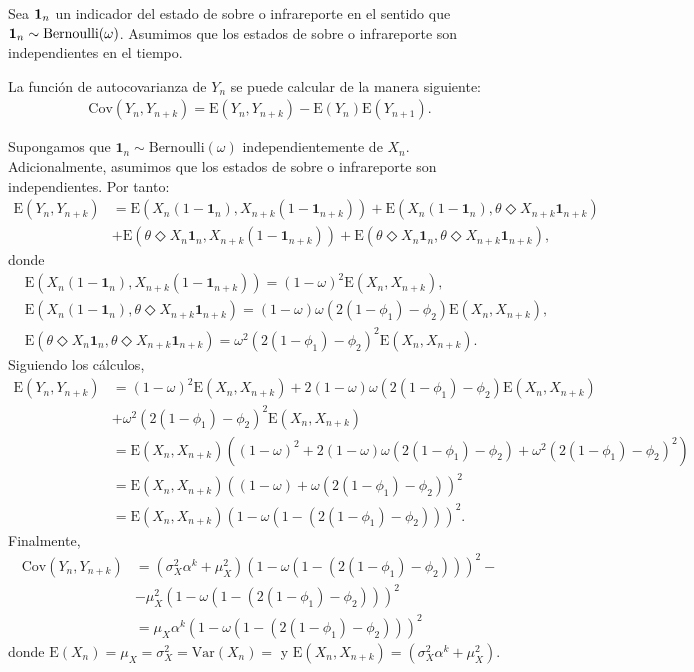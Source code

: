 \documentclass[12pt,twoside]{article} %
\begin{document}
\noindent Sea ${\bf 1}_n$ un indicador del estado de sobre o infrareporte en el sentido que ${\bf 1}_n \sim \textrm{Bernoulli}(\omega)$. Asumimos que los estados de sobre o infrareporte son independientes en el tiempo. 

\medskip

\noindent La función de autocovarianza de $Y_n$ se puede calcular de la manera siguiente:
\begin{align}\label{cov}
\textrm{Cov}\left(Y_n,Y_{n+k}\right)=\textrm{E}\left(Y_n,Y_{n+k}\right)-\textrm{E}(Y_n)\textrm{E}(Y_{n+1}). 
\end{align}

\noindent Supongamos que $\textbf{1}_n \sim \textrm{Bernoulli}(\omega)$ independientemente de $X_n$. Adicionalmente, asumimos que los estados de sobre o infrareporte son independientes. Por tanto:
\begin{align}\label{exp}
\textrm{E}\left(Y_n,Y_{n+k}\right)&=\textrm{E}\left(X_n(1-\textbf{1}_n),X_{n+k}(1-\textbf{1}_{n+k})\right)+\textrm{E}\left(X_n(1-\textbf{1}_n),\theta \Diamond X_{n+k}\textbf{1}_{n+k}\right) \nonumber \\ &+\textrm{E}\left(\theta \Diamond X_n\textbf{1}_n,X_{n+k}(1-\textbf{1}_{n+k})\right)+\textrm{E}\left(\theta \Diamond X_n\textbf{1}_n,\theta \Diamond X_{n+k}\textbf{1}_{n+k}\right),
\end{align}
donde
\begin{align*}
&\textrm{E}\left(X_n(1-\textbf{1}_n),X_{n+k}(1-\textbf{1}_{n+k})\right)=(1-\omega)^2\textrm{E}(X_n,X_{n+k}), \\
&\textrm{E}\left(X_n(1-\textbf{1}_n),\theta \Diamond X_{n+k}\textbf{1}_{n+k}\right)=(1-\omega)\omega(2(1-\phi_1)-\phi_2)\textrm{E}(X_n,X_{n+k}), \\
&\textrm{E}\left(\theta \Diamond X_n\textbf{1}_n,\theta \Diamond X_{n+k}\textbf{1}_{n+k}\right)=\omega^2(2(1-\phi_1)-\phi_2)^2\textrm{E}(X_n,X_{n+k}).
\end{align*}
Siguiendo los cálculos, 
\begin{align*}
\textrm{E}\left(Y_n,Y_{n+k}\right)&=(1-\omega)^2\textrm{E}(X_n,X_{n+k})+2(1-\omega)\omega(2(1-\phi_1)-\phi_2)\textrm{E}(X_n,X_{n+k})\\&+\omega^2(2(1-\phi_1)-\phi_2)^2\textrm{E}(X_n,X_{n+k})\\&=\textrm{E}(X_n,X_{n+k})\left((1-\omega)^2+2(1-\omega)\omega(2(1-\phi_1)-\phi_2)+\omega^2(2(1-\phi_1)-\phi_2)^2\right)\\&=\textrm{E}(X_n,X_{n+k})\left((1-\omega)+\omega(2(1-\phi_1)-\phi_2)\right)^2\\&=\textrm{E}(X_n,X_{n+k})(1-\omega(1-\left(2(1-\phi_1)-\phi_2\right)))^2.
\end{align*}
Finalmente, 
\begin{align*}
\textrm{Cov}\left(Y_n,Y_{n+k}\right)&=(\sigma_X^2\alpha^k+\mu_X^2)(1-\omega(1-\left(2(1-\phi_1)-\phi_2\right)))^2-\\
& - \mu_X^2(1-\omega\left(1-\left(2(1-\phi_1)-\phi_2\right)\right))^2\\&=\mu_X\alpha^k(1-\omega(1-\left(2(1-\phi_1)-\phi_2\right)))^2
\end{align*}
donde $\textrm{E}(X_n)=\mu_X=\sigma_X^2=\textrm{Var}(X_n)=$ y $\textrm{E}(X_n,X_{n+k})=(\sigma_X^2\alpha^k+\mu_X^2)$.
\end{document}
